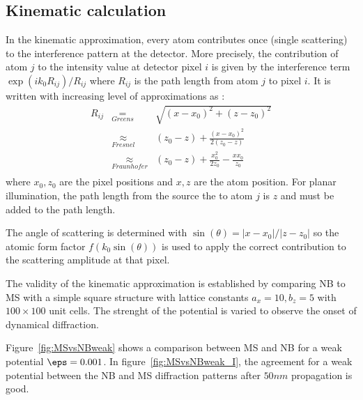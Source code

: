 \documentclass[a4paper,10pt]{article}
\begin{document}
\subsection{Kinematic calculation}
In the kinematic approximation, every atom contributes once (single scattering) to the interference pattern at the detector.
More precisely, the contribution of atom $j$ to the intensity value at detector pixel $i$ is given by the interference term $\exp(ik_0 R_{ij})/R_{ij}$ where  $R_{ij}$ is the path length from atom $j$ to pixel $i$.
It is written with increasing level of approximations as :
\begin{eqnarray}
R_{ij}
      &\underset{Greens}{=}& \sqrt{\left(x-x_0\right)^2+\left(z-z_0\right)^2} \\
       &\underset{Fresnel}{\approx}&     \left(z_0-z\right) + \frac{\left(x-x_0\right)^2}{2\left(z_0-z\right)} \\
       &\underset{Fraunhofer}{\approx}&  \left(z_0-z\right) + \frac{x_0^2}{2z_0} - \frac{xx_0}{z_0}  \\
\end{eqnarray}
where $x_0,z_0$ are the pixel positions and $x,z$ are the atom position.
For planar illumination, the path length from the source the to atom $j$ is $z$ and must be added to the path length.

The angle of scattering is determined with $\sin(\theta)=|x-x_0|/|z-z_0|$ so the atomic form factor $f(k_0\sin(\theta))$ is used to apply the correct contribution to the scattering amplitude at that pixel.


The validity of the kinematic approximation is established by comparing NB to MS with a simple square structure with lattice constants $a_x=10,b_z=5$ with $100\times100$ unit cells.
The strenght of the potential is varied to observe the onset of dynamical diffraction.

Figure~\ref{fig:MSvsNBweak} shows a comparison between MS and NB for a weak potential $\eps=0.001$. In figure~\ref{fig:MSvsNBweak_I}, the agreement for a weak potential between the NB and MS diffraction patterns after $50nm$ propagation is good.
\end{document}
